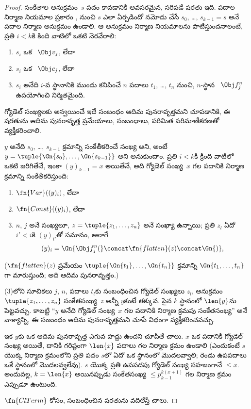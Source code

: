 \documentclass[../../../include/open-logic-section]{subfiles}
\begin{document}
\begin{proof}
సంకేతాల అనుక్రమం~$s$ పదం కావడానికి అవసరమైన, సరిపడే షరతు ఇది. పదాల
నిర్మాణ నియమాల ప్రకారం ,
 నుంచి $s$ ఎలా ఏర్పడిందో నమోదు చేసే
$s_0$, \dots, $s_{k-1}=s$ అనే పదాల నిర్మాణ అనుక్రమం ఉండాలి. ఆ అనుక్రమం నిర్మాణ నియమాలను పాటిస్తుందనాలంటే, ప్రతి $i<k$కి కింది వాటిలో
ఒకటి నెరవేరాలి:
\begin{enumerate}
\item $s_i$ ఒక ~$\Obj v_j$, లేదా
\item $s_i$ ఒక ~$\Obj c_j$, లేదా
\item $s_i$ అనేది $i$-వ స్థానానికి ముందు కనిపించే $n$ పదాలు
  $t_1$, \dots, $t_n$ నుంచి, $n$-స్థాన
  ~$\Obj f^n_j$ ఉపయోగించి నిర్మితమైంది.
\end{enumerate}
గ్యోడెల్ సంఖ్యలకు అన్వయించే ఇదే సంబంధం ఆదిమ పునరావృత్తమని చూపడానికి,
ఈ షరతును ఆదిమ పునరావృత్త ప్రమేయాలు, సంబంధాలు, పరిమిత పరిమాణీకరణతో
వ్యక్తీకరించాలి.

$y$ అనేది $s_0$, \dots, $s_{k-1}$ క్రమాన్ని సంకేతీకరించే సంఖ్య అని,
అంటే $y=\tuple{\Gn{s_0},\dots,\Gn{s_{k-1}}}$ అని అనుకుందాం. ప్రతి $i<k$కి
క్రింది వాటిలో ఒకటి జరిగితేనే, ఇంకా $(y)_{k-1}=x$ అయితేనే, అది గ్యోడెల్
సంఖ్య~$x$ గల పదానికి నిర్మాణ క్రమాన్ని సంకేతీకరిస్తుంది:
\begin{enumerate}
\item $\fn{Var}((y)_i)$, లేదా
\item $\fn{Const}((y)_i)$, లేదా
\item $n$, $j$ అనే సంఖ్యలూ, $z=\tuple{z_1,\dots,z_n}$ అనే సంఖ్యా ఉన్నాయి;
  ప్రతి $z_l$ ఏదో $i'<i$కి $(y)_{i'}$తో సమానం, అలాగే
\[
(y)_i = \Gn{\Obj f^n_j(} \concat \fn{flatten}(z) \concat \Gn{)},
\]
\end{enumerate}
($\fn{flatten}(z)$ ప్రమేయం $\tuple{\Gn{t_1},\dots,\Gn{t_n}}$ క్రమాన్ని
$\Gn{t_1,\dots,t_n}$గా మారుస్తుంది; అది ఆదిమ పునరావృత్తం.)

(3)లోని సూచికలు $j$, $n$, పదాలు $t_l$కు సంబంధించిన గ్యోడెల్ సంఖ్యలు $z_l$,
అనుక్రమం $\tuple{z_1,\dots,z_n}$ సంకేతసంఖ్య~$z$ అన్నీ $y$కంటే తక్కువ.
పైన $k$ స్థానంలో $\len{y}$ను పెట్టవచ్చు. కాబట్టి ``$y$ అనేది గ్యోడెల్
సంఖ్య~$x$ గల పదానికి నిర్మాణ క్రమపు సంకేతసంఖ్య'' అనే వాక్యాన్ని, ఈ సంబంధం
ఆదిమ పునరావృత్తమని చూపే విధంగా వ్యక్తీకరించవచ్చు.

ఇక $y$కు ఒక ఆదిమ పునరావృత్త ఎగువ హద్దు ఉందని చూపితే చాలు.
$x$ ఒక పదానికి గ్యోడెల్ సంఖ్య అయితే, దానికి గరిష్ఠంగా $\len{x}$ పదాలు గల
నిర్మాణ క్రమం ఉండాలి (ఎందుకంటే $s$ యొక్క నిర్మాణ క్రమంలోని ప్రతి పదం
$s$లో ఏదో ఒక స్థానంలో మొదలవ్వాలి; రెండు ఉపపదాలు ఒకే స్థానంలో మొదలవ్వలేవు).
$s$ యొక్క ప్రతి ఉపపదపు గ్యోడెల్ సంఖ్య సహజంగానే $\le x$. అందువల్ల,
$k=\len{x}$ అయినప్పుడు సంకేతసంఖ్య $\le p_{k-1}^{k(x+1)}$ గల నిర్మాణ
క్రమం ఎప్పుడూ ఉంటుంది.

$\fn{ClTerm}$ కోసం,  సంబంధించిన షరతును వదిలేస్తే చాలు.
\end{proof}
\end{document}
